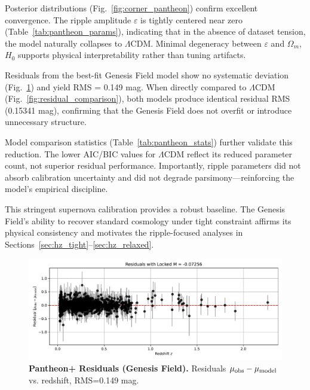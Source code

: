 Posterior distributions (Fig.~\ref{fig:corner_pantheon}) confirm excellent convergence. The ripple amplitude $\varepsilon$ is tightly centered near zero (Table~\ref{tab:pantheon_params}), indicating that in the absence of dataset tension, the model naturally collapses to $\Lambda$CDM. Minimal degeneracy between $\varepsilon$ and $\Omega_m$, $H_0$ supports physical interpretability rather than tuning artifacts.

Residuals from the best-fit Genesis Field model show no systematic deviation (Fig.~\ref{fig:residuals_pantheon}) and yield RMS = 0.149 mag. When directly compared to $\Lambda$CDM (Fig.~\ref{fig:residual_comparison}), both models produce identical residual RMS (0.15341 mag), confirming that the Genesis Field does not overfit or introduce unnecessary structure.

Model comparison statistics (Table~\ref{tab:pantheon_stats}) further validate this reduction. The lower AIC/BIC values for $\Lambda$CDM reflect its reduced parameter count, not superior residual performance. Importantly, ripple parameters did not absorb calibration uncertainty and did not degrade parsimony—reinforcing the model’s empirical discipline.

This stringent supernova calibration provides a robust baseline. The Genesis Field’s ability to recover standard cosmology under tight constraint affirms its physical consistency and motivates the ripple-focused analyses in Sections~\ref{sec:hz_tight}–\ref{sec:hz_relaxed}.

\begin{figure}[htpb]
\centering
\includegraphics[width=\textwidth]{figures/sn_mcmc_residuals.pdf}
\caption{\textbf{Pantheon+ Residuals (Genesis Field).} Residuals $ \mu_{\rm obs} - \mu_{\rm model} $ vs. redshift, RMS=0.149 mag.}
\label{fig:residuals_pantheon}
\end{figure}

